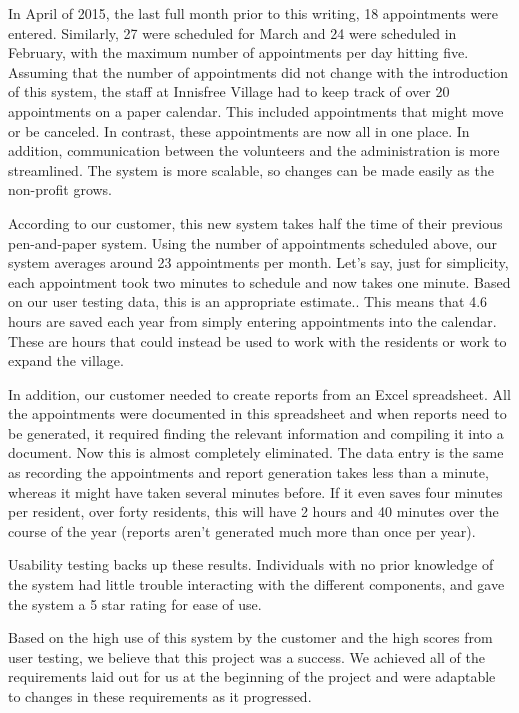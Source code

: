\documentclass{sig-alternate}
\begin{document}
In April of 2015, the last full month prior to this writing, 18 appointments were entered. Similarly, 27 were scheduled for March and 24 were scheduled in February, with the maximum number of appointments per day hitting five. Assuming that the number of appointments did not change with the introduction of this system, the staff at Innisfree Village had to keep track of over 20 appointments on a paper calendar. This included appointments that might move or be canceled. In contrast, these appointments are now all in one place. In addition, communication between the volunteers and the administration is more streamlined. The system is more scalable, so changes can be made easily as the non-profit grows. 

According to our customer, this new system takes half the time of their previous pen-and-paper system. Using the number of appointments scheduled above, our system averages around 23 appointments per month. Let's say, just for simplicity, each appointment took two minutes to schedule and now takes one minute. Based on our user testing data, this is an appropriate estimate.. This means that 4.6 hours are saved each year from simply entering appointments into the calendar. These are hours that could instead be used to work with the residents or work to expand the village.

In addition, our customer needed to create reports from an Excel spreadsheet. All the appointments were documented in this spreadsheet and when reports need to be generated, it required finding the relevant information and compiling it into a document. Now this is almost completely eliminated. The data entry is the same as recording the appointments and report generation takes less than a minute, whereas it might have taken several minutes before. If it even saves four minutes per resident, over forty residents, this will have 2 hours and 40 minutes over the course of the year (reports aren't generated much more than once per year).

Usability testing backs up these results. Individuals with no prior knowledge of the system had little trouble interacting with the different components, and gave the system a 5 star rating for ease of use.

Based on the high use of this system by the customer and the high scores from user testing, we believe that this project was a success. We achieved all of the requirements laid out for us at the beginning of the project and were adaptable to changes in these requirements as it progressed.
\end{document}
